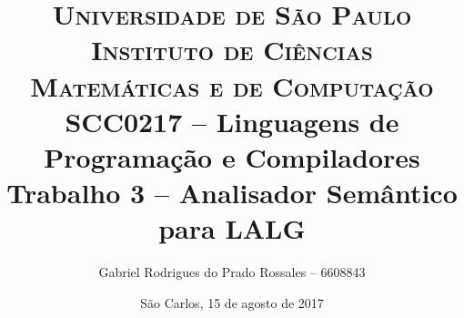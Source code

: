 \begin{titlepage}

		\title{
\textsc {\large{Universidade de São Paulo\\
Instituto de Ciências Matemáticas e de Computação}}\\[1cm]
\large{SCC0217 -- Linguagens de Programação e Compiladores}\\[6cm]
\LARGE{Trabalho 3 -- Analisador Semântico para LALG}\\[5.5cm]
		}

		\author{
Gabriel Rodrigues do Prado Rossales -- 6608843
		}

		\date{
\vfill São Carlos, 15 de agosto de 2017
		}

		\maketitle
		\thispagestyle{empty}

\end{titlepage}
